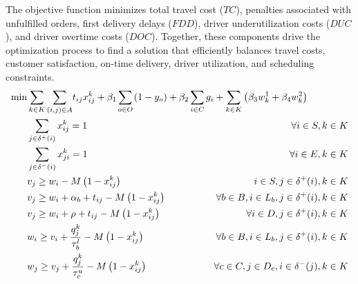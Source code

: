 \documentclass[authoryear,preprint,review,11pt]{elsarticle}
\begin{document}
The objective function minimizes total travel cost ($TC$), penalties associated with unfulfilled orders, first delivery delays ($FDD$), driver underutilization costs ($DUC$), and driver overtime costs ($DOC$). Together, these components drive the optimization process to find a solution that efficiently balances travel costs, customer satisfaction, on-time delivery, driver utilization, and scheduling constraints.
{
\small
\begin{alignat}{3}
    \label{mod:obj}   \min & \sum_{k \in K}{{ \sum_{ \substack{(i,j) \in A} }} {t_{ij}x^{k}_{ij}}} + \beta_1\smashoperator{\sum_{ o \in O}}{  \left(1-y_o\right)} \hspace{-0mm}  + \beta_2 \smashoperator{ \sum_{i \in C } } { g_i  } +  \sum_{k \in K}\left({\beta_3 w^{1}_k  + \beta_4  w^{2}_k}\right) &                             \\
    \label{mod:c1}         & \sum_{j \in \delta^{+}(i) }{x^k_{ij}} =1   & \hspace{-10mm}  \forall i \in S, k \in K   \\
    \label{mod:c2}         & \sum_{j \in \delta^{-}(i)}{x^k_{ji}} = 1     & \hspace{-10mm} \forall i \in E, k \in K\\
    \label{mod:c03}        & v_j \geq  w_i  - M\left(1-x^{k}_{ij}\right)   & \hspace{-30mm}  i \in S, j \in \delta^{+}(i),  k \in K      \\
    \label{mod:c3}         & v_j \geq  w_i + \alpha_{b} + t_{ij} - M\left(1-x^{k}_{ij}\right) & \hspace{-40mm} \forall b \in B, i \in L_b, j \in \delta^{+}(i),  k \in K     \\
    \label{mod:c4}         & v_j \geq  w_i + \rho + t_{ij} - M\left(1-x^{k}_{ij}\right)                                                                       & \hspace{-40mm} \forall i \in D  , j \in \delta^{+}(i), k \in K                         \\
    \label{mod:c5}         & w_{i} \geq v_{i}  + \frac{q^k_j}{\tau^l_b} -M\left(1- x^{k}_{ij}\right)   & \hspace{-40mm} \forall  b \in B,  i \in L_{b},  j \in \delta^{+}(i), k \in K \\
    \label{mod:c6}         & w_{j} \geq v_{j}  + {  \frac{q^k_j}{\tau^u_c} -M\left(1- x^{k}_{ij}\right) }     & \hspace{-40mm}  \forall c \in  C, j \in D_{c}, i \in \delta^{-}(j),  k \in K \\

\end{alignat}}
\end{document}
